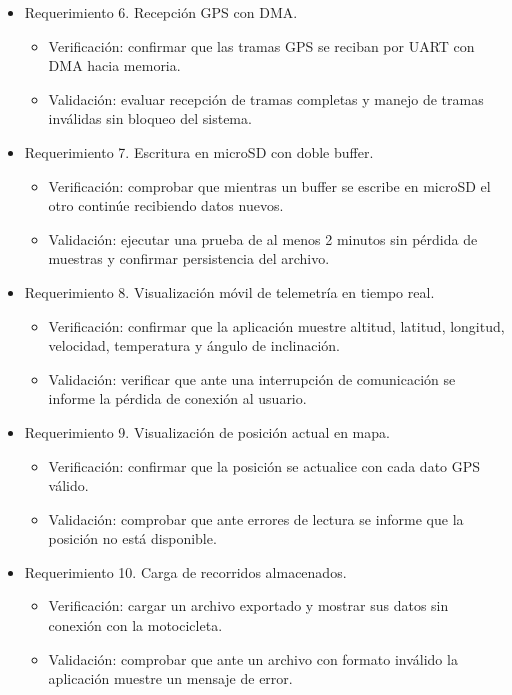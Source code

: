 \documentclass[
11pt, %
]{charter}
\begin{document}
\begin{itemize}
\begin{itemize}
	\end{itemize}
\item Requerimiento 6. Recepción GPS con DMA.
	\begin{itemize}
	\item Verificación: confirmar que las tramas GPS se reciban por UART con DMA hacia memoria.
	\item Validación: evaluar recepción de tramas completas y manejo de tramas inválidas sin bloqueo del sistema.
	\end{itemize}
\item Requerimiento 7. Escritura en microSD con doble buffer.
	\begin{itemize}
	\item Verificación: comprobar que mientras un buffer se escribe en microSD el otro continúe recibiendo datos nuevos.
	\item Validación: ejecutar una prueba de al menos 2 minutos sin pérdida de muestras y confirmar persistencia del archivo.
	\end{itemize}
\item Requerimiento 8. Visualización móvil de telemetría en tiempo real.
	\begin{itemize}
	\item Verificación: confirmar que la aplicación muestre altitud, latitud, longitud, velocidad, temperatura y ángulo de inclinación.
	\item Validación: verificar que ante una interrupción de comunicación se informe la pérdida de conexión al usuario.
	\end{itemize}
\item Requerimiento 9. Visualización de posición actual en mapa.
	\begin{itemize}
	\item Verificación: confirmar que la posición se actualice con cada dato GPS válido.
	\item Validación: comprobar que ante errores de lectura se informe que la posición no está disponible.
	\end{itemize}
\item Requerimiento 10. Carga de recorridos almacenados.
	\begin{itemize}
	\item Verificación: cargar un archivo exportado y mostrar sus datos sin conexión con la motocicleta.
	\item Validación: comprobar que ante un archivo con formato inválido la aplicación muestre un mensaje de error.
	\end{itemize}
\end{itemize}
\end{document}
